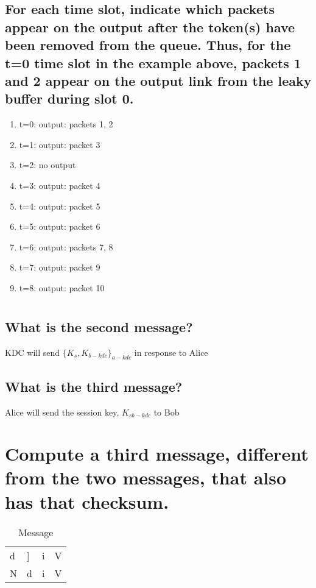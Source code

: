 \documentclass[10pt,a4paper]{article}
\begin{document}
\subsection{For each time slot, indicate which packets appear on the output after the token(s) have been removed from the queue. Thus, for the t=0 time slot in the example above, packets 1 and 2 appear on the output link from the leaky buffer during slot 0.}
\begin{enumerate} 
	\item{t=0: output: packets 1, 2}
	\item{t=1: output: packet 3}
	\item{t=2: no output}
	\item{t=3: output: packet 4}
	\item{t=4: output: packet 5}
	\item{t=5: output: packet 6}
	\item{t=6: output: packets 7, 8}
	\item{t=7: output: packet 9}
	\item{t=8: output: packet 10}
\end{enumerate}	

\section{}
\subsection{What is the second message?}
KDC will send $\lbrace K_{s}, K_{b-kdc} \rbrace_{a-kdc} $ in response to Alice

\subsection{What is the third message?}
Alice will send the session key, $K_{sb-kdc}$ to Bob

\section{Compute a third message, different from the two messages, that also has that checksum.}
\begin{table}[h]
\centering
\caption{Message}
\label{my-label}
\begin{tabular}{llll}
d & {]} & i & V \\
N & d   & i & V
\end{tabular}
\end{table}
\end{document}

